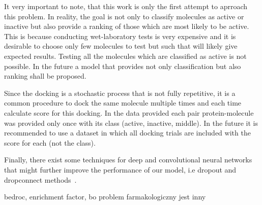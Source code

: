 \documentclass[a4paper,10pt]{report}
\begin{document}
      It very important to note, that this work is only the first attempt to aprroach this problem. In reality, the goal is not only to classify molecules as active or inactive but also provide a ranking of those which are most likely to be active. This is because conducting wet-laboratory tests is very expensive and it is desirable to choose only few molecules to test but such that will likely give expected results. Testing all the molecules which are classified as active is not possible. In the future a model that provides not only classification but also ranking shall be proposed.
      
      Since the docking is a stochastic process that is not fully repetitive, it is a common procedure to dock the same molecule multiple times and each time calculate score for this docking. In the data provided each pair protein-molecule was provided only once with its class (active, inactive, middle). In the future it is recommended to use a dataset in which all docking trials are included with the score for each (not the class).
      
      Finally, there exist some techniques for deep and convolutional neural networks that might further improve the performance of our model, i.e dropout and dropconnect methods~\cite{DUTCH}.
      
      bedroc, enrichment factor, bo problem farmakologiczny jest inny
\end{document}
